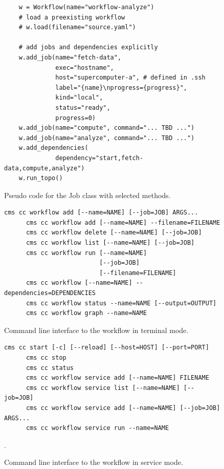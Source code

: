 \begin{figure}[htb]
{\scriptsize
\begin{verbatim}
    w = Workflow(name="workflow-analyze")
    # load a preexisting workflow
    # w.load(filename="source.yaml")
    
    # add jobs and dependencies explicitly
    w.add_job(name="fetch-data",
              exec="hostname",
              host="supercomputer-a", # defined in .ssh
              label="{name}\nprogress={progress}",
              kind="local",
              status="ready",
              progress=0)
    w.add_job(name="compute", command="... TBD ...")
    w.add_job(name="analyze", command="... TBD ...")
    w.add_dependencies(
              dependency="start,fetch-data,compute,analyze")
    w.run_topo()
\end{verbatim}
}
\caption{Pseudo code for the Job class with selected methods.}
\label{fig:code-workflow-example}

\bigskip

{\scriptsize
\begin{Verbatim}[breaklines=true]
      cms cc workflow add [--name=NAME] [--job=JOB] ARGS...
      cms cc workflow add [--name=NAME] --filename=FILENAME
      cms cc workflow delete [--name=NAME] [--job=JOB]
      cms cc workflow list [--name=NAME] [--job=JOB]
      cms cc workflow run [--name=NAME] 
                          [--job=JOB] 
                          [--filename=FILENAME]
      cms cc workflow [--name=NAME] --dependencies=DEPENDENCIES
      cms cc workflow status --name=NAME [--output=OUTPUT]
      cms cc workflow graph --name=NAME
\end{Verbatim}
}

\caption{Command line interface to the workflow in terminal mode.}
\label{fig:code-workflow-commandline}

\bigskip

{\scriptsize
\begin{Verbatim}[breaklines=true]
      cms cc start [-c] [--reload] [--host=HOST] [--port=PORT]
      cms cc stop
      cms cc status
      cms cc workflow service add [--name=NAME] FILENAME
      cms cc workflow service list [--name=NAME] [--job=JOB]
      cms cc workflow service add [--name=NAME] [--job=JOB] ARGS...
      cms cc workflow service run --name=NAME
\end{Verbatim}
}

\caption{Command line interface to the workflow in service mode.}
\label{fig:code-workflow-service-commandline}.



\end{figure}


